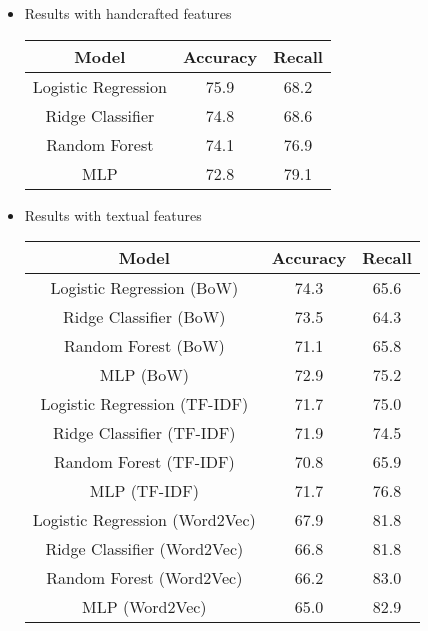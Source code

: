 \documentclass[final]{cvpr}
\begin{document}
\begin{itemize}

\item Results with handcrafted features
\begin{center}
\begin{tabular}{ c c c } 
\hline
Model & Accuracy & Recall\\ 
\hline
Logistic Regression & 75.9 & 68.2 \\ 
Ridge Classifier & 74.8 & 68.6 \\
Random Forest & 74.1 & 76.9 \\
MLP & 72.8 & 79.1 \\
\hline
\end{tabular}
\end{center}


\item Results with textual features
\begin{center}
\begin{tabular}{ c c c } 
\hline
Model & Accuracy & Recall\\ 
\hline
Logistic Regression (BoW) & 74.3 & 65.6 \\ 
Ridge Classifier (BoW) & 73.5 & 64.3 \\
Random Forest (BoW) & 71.1 & 65.8 \\
MLP (BoW) & 72.9 & 75.2 \\
Logistic Regression (TF-IDF) & 71.7 & 75.0 \\ 
Ridge Classifier (TF-IDF) & 71.9 & 74.5 \\
Random Forest (TF-IDF) & 70.8 & 65.9 \\
MLP (TF-IDF) & 71.7 & 76.8 \\
Logistic Regression (Word2Vec) & 67.9 & 81.8 \\ 
Ridge Classifier (Word2Vec) & 66.8 & 81.8 \\
Random Forest (Word2Vec) & 66.2 & 83.0 \\
MLP (Word2Vec) & 65.0 & 82.9 \\
\hline
\end{tabular}
\end{center}



\end{itemize}
\end{document}

